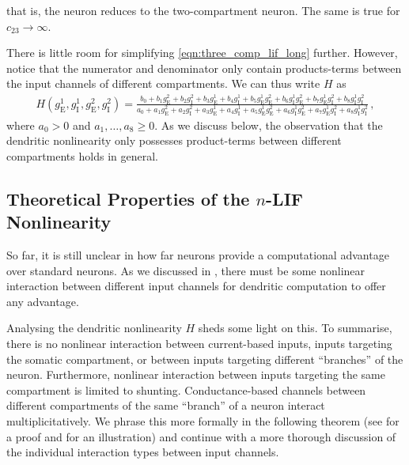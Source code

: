 that is, the neuron reduces to the two-compartment neuron. The same is true for $c_\mathrm{23} \to \infty$.

There is little room for simplifying \cref{eqn:three_comp_lif_long} further.
However, notice that the numerator and denominator only contain products-terms between the input channels of different compartments.
We can thus write $H$ as
\begin{align}
	H(g_\mathrm{E}^1, g_\mathrm{I}^1, g_\mathrm{E}^2, g_\mathrm{I}^2) =
		\frac{
	        b_0 + b_1 g^2_\mathrm{E} + b_2 g^2_\mathrm{I} +
	              b_3 g^1_\mathrm{E} + b_4 g^1_\mathrm{I} +
	              b_5 g^1_\mathrm{E} g^2_\mathrm{E} +
	              b_6 g^1_\mathrm{I} g^2_\mathrm{E} +
	              b_7 g^1_\mathrm{E} g^2_\mathrm{I} +
	              b_8 g^1_\mathrm{I} g^2_\mathrm{I}
        }{
	        a_0 + a_1 g^2_\mathrm{E} + a_2 g^2_\mathrm{I} +
	              a_3 g^1_\mathrm{E} + a_4 g^1_\mathrm{I} +
	              a_5 g^1_\mathrm{E} g^2_\mathrm{E} +
	              a_6 g^1_\mathrm{I} g^2_\mathrm{E} +
	              a_7 g^1_\mathrm{E} g^2_\mathrm{I} +
	              a_8 g^1_\mathrm{I} g^2_\mathrm{I}
        } \,,
    \label{eqn:three_comp_lif}
\end{align}
where $a_0 > 0$ and $a_1, \ldots, a_8 \geq 0$.
As we discuss below, the observation that the \nlif dendritic nonlinearity only possesses product-terms between different compartments holds in general.

\subsection{Theoretical Properties of the $n$-LIF Nonlinearity}
\label{sec:nlif_theory}

So far, it is still unclear in how far \nlif neurons provide a computational advantage over standard \LIF neurons.
As we discussed in , there must be some nonlinear interaction between different input channels for dendritic computation to offer any advantage.

Analysing the dendritic nonlinearity $H$ sheds some light on this.
To summarise, there is no nonlinear interaction between current-based inputs, inputs targeting the somatic compartment, or between inputs targeting different \enquote{branches} of the neuron.
Furthermore, nonlinear interaction between inputs targeting the same compartment is limited to shunting.
Conductance-based channels between different compartments of the same \enquote{branch} of a neuron interact multiplicitatively.
We phrase this more formally in the following theorem (see  for a proof and  for an illustration) and continue with a more thorough discussion of the individual interaction types between input channels.

